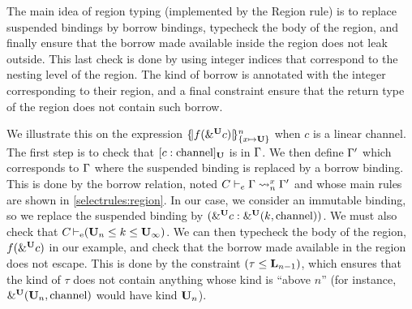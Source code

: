 The main idea of region typing (implemented by the {\sc Region} rule)
is to replace suspended bindings by borrow bindings, typecheck the body
of the region, and finally ensure that the borrow made available inside
the region does not leak outside.
This last check is done by using integer indices that correspond to the nesting
level of the region. The kind of borrow is annotated with the integer
corresponding to their region, and a final constraint ensure that
the return type of the region does not contain such borrow.

We illustrate this on the expression $\region{\Sone x\IBORROW}{f(\borrow[\IBORROW]{c})}$
when $c$ is a linear channel.
The first step is to check that
$\svar[\IBORROW]{c}{\text{channel}}$ is in $\E$. We then define $\E'$ which
corresponds to $\E$ where the suspended binding is replaced by a borrow binding.
%
This is done by the borrow relation, noted $\lregion{C}{x}{\E}{\E'}$ and
whose main rules are shown in \cref{selectrules:region}.
In our case, we consider an immutable binding, so we replace the suspended
binding by $\bvar{\borrow[\IBORROW]{c}}{\borrowty[\IBORROW]{k}{\text{channel}}}$.
We must also check that $\entail{C}{(\kun_n\lk k\lk\kun_\infty)}$.
We can then typecheck the body of the region, $f(\borrow[\IBORROW]{c})$ in our example, and check that the borrow made available in the region does not escape.
This is done by the constraint $\Cleq{\tau}{\klin_{n-1}}$, which ensures
that the kind of $\tau$ does not contain anything whose kind is ``above $n$''
(for instance, $\borrowty[\IBORROW]{\kun_n}{\text{channel}}$ would have kind
$\kun_n$).

